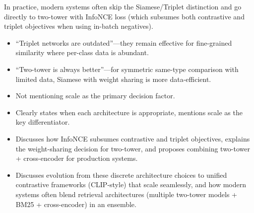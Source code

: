 \begin{interviewq}
In practice, modern systems often skip the Siamese/Triplet distinction and go directly to two-tower with InfoNCE loss (which subsumes both contrastive and triplet objectives when using in-batch negatives).

\redflags
\begin{itemize}
    \item ``Triplet networks are outdated''---they remain effective for fine-grained similarity where per-class data is abundant.
    \item ``Two-tower is always better''---for symmetric same-type comparison with limited data, Siamese with weight sharing is more data-efficient.
    \item Not mentioning scale as the primary decision factor.
\end{itemize}


\goodgreat
\begin{itemize}
    \item {} Clearly states when each architecture is appropriate, mentions scale as the key differentiator.
    \item {} Discusses how InfoNCE subsumes contrastive and triplet objectives, explains the weight-sharing decision for two-tower, and proposes combining two-tower + cross-encoder for production systems.
    \item {} Discusses evolution from these discrete architecture choices to unified contrastive frameworks (CLIP-style) that scale seamlessly, and how modern systems often blend retrieval architectures (multiple two-tower models + BM25 + cross-encoder) in an ensemble.
\end{itemize}

\end{interviewq}


